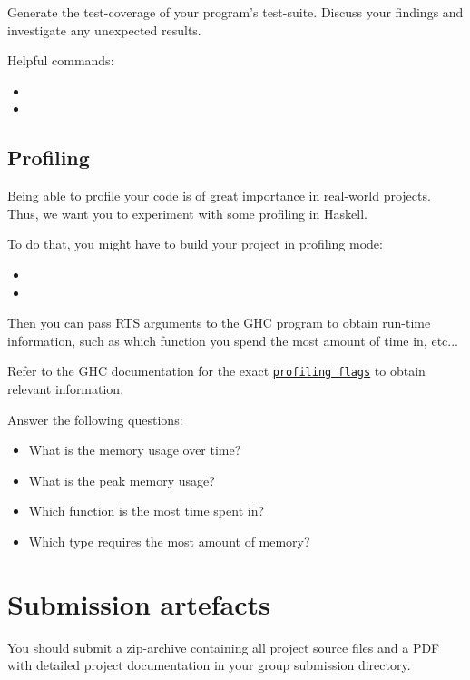 \documentclass{article}
\begin{document}
Generate the test-coverage of your program's test-suite.
Discuss your findings and investigate any unexpected results.

Helpful commands:

\begin{itemize}
\item {}
\item {}
\end{itemize}

\subsection{Profiling}

Being able to profile your code is of great importance in real-world projects. Thus, we want you to experiment with some profiling in Haskell.

To do that, you might have to build your project in profiling mode:

\begin{itemize}
\item {}
\item {}
\end{itemize}

Then you can pass RTS arguments to the GHC program to obtain run-time information, such as which function you spend the most amount of time in, etc...

Refer to the GHC documentation for the exact \href{https://downloads.haskell.org/ghc/latest/docs/html/users_guide/profiling.html#profiling-memory-usage}{\texttt{profiling flags}} to obtain relevant information.

Answer the following questions:

\begin{itemize}
\item What is the memory usage over time?
\item What is the peak memory usage?
\item Which function is the most time spent in?
\item Which type requires the most amount of memory?
\end{itemize}

\section{Submission artefacts}

You should submit a zip-archive containing all project source files and a PDF with detailed project documentation in your group submission directory.
\end{document}
